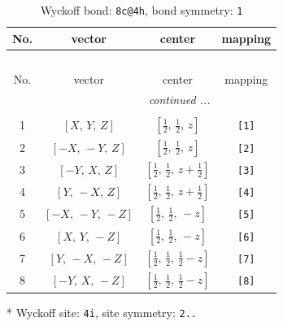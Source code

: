 \documentclass[fleqn,8pt]{jsarticle}
\begin{document}
\renewcommand{\arraystretch}{1.2}
\begin{longtable}{cccc}
\caption{Wyckoff bond: {\tt 8c@4h}, bond symmetry: {\tt 1}}
 \\
 \hline \hline
No. & vector & center & mapping \\ \hline \endfirsthead

\multicolumn{3}{l}{\tablename\ \thetable{}} \\
 \hline \hline
No. & vector & center & mapping \\ \hline \endhead

 \hline \hline
\multicolumn{3}{r}{\footnotesize\it continued ...} \\ \endfoot

 \hline \hline
\multicolumn{3}{r}{} \\ \endlastfoot

1 & $\left[ X,\, Y,\, Z \right]$ & $\left[ \frac{1}{2},\, \frac{1}{2},\, z \right]$ & {\tt [1]} \\ \hline
2 & $\left[ - X,\, - Y,\, Z \right]$ & $\left[ \frac{1}{2},\, \frac{1}{2},\, z \right]$ & {\tt [2]} \\ \hline
3 & $\left[ - Y,\, X,\, Z \right]$ & $\left[ \frac{1}{2},\, \frac{1}{2},\, z + \frac{1}{2} \right]$ & {\tt [3]} \\ \hline
4 & $\left[ Y,\, - X,\, Z \right]$ & $\left[ \frac{1}{2},\, \frac{1}{2},\, z + \frac{1}{2} \right]$ & {\tt [4]} \\ \hline
5 & $\left[ - X,\, - Y,\, - Z \right]$ & $\left[ \frac{1}{2},\, \frac{1}{2},\, - z \right]$ & {\tt [5]} \\ \hline
6 & $\left[ X,\, Y,\, - Z \right]$ & $\left[ \frac{1}{2},\, \frac{1}{2},\, - z \right]$ & {\tt [6]} \\ \hline
7 & $\left[ Y,\, - X,\, - Z \right]$ & $\left[ \frac{1}{2},\, \frac{1}{2},\, \frac{1}{2} - z \right]$ & {\tt [7]} \\ \hline
8 & $\left[ - Y,\, X,\, - Z \right]$ & $\left[ \frac{1}{2},\, \frac{1}{2},\, \frac{1}{2} - z \right]$ & {\tt [8]} \\
\end{longtable}
* Wyckoff site: {\tt 4i}, site symmetry: {\tt 2..}
\renewcommand{\arraystretch}{1.2}
\end{document}
